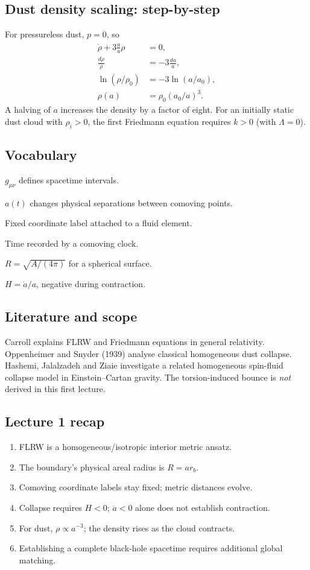 \documentclass[11pt,a4paper]{article}
\begin{document}
\subsection{Dust density scaling: step-by-step}
For pressureless dust, $p=0$, so
\begin{align}
\dot\rho+3\frac{\dot a}{a}\rho&=0,\\
\frac{d\rho}{\rho}&=-3\frac{da}{a},\\
\ln(\rho/\rho_0)&=-3\ln(a/a_0),\\
\boxed{\rho(a)}&=\boxed{\rho_0(a_0/a)^3}.
\end{align}
A halving of $a$ increases the density by a factor of eight. For an initially static dust cloud with $\rho_i>0$, the first Friedmann equation requires $k>0$ (with $\Lambda=0$).
\subsection{Vocabulary}
\begin{description}[style=nextline]
\item[Metric tensor] $g_{\mu\nu}$ defines spacetime intervals.
\item[Scale factor] $a(t)$ changes physical separations between comoving points.
\item[Comoving coordinate] Fixed coordinate label attached to a fluid element.
\item[Proper time] Time recorded by a comoving clock.
\item[Areal radius] $R=\sqrt{A/(4\pi)}$ for a spherical surface.
\item[Hubble parameter] $H=\dot a/a$, negative during contraction.
\end{description}
\subsection{Literature and scope}
Carroll explains FLRW and Friedmann equations in general relativity. Oppenheimer and Snyder (1939) analyse classical homogeneous dust collapse. Hashemi, Jalalzadeh and Ziaie investigate a related homogeneous spin-fluid collapse model in Einstein--Cartan gravity. The torsion-induced bounce is \emph{not} derived in this first lecture.
\subsection{Lecture 1 recap}
\begin{enumerate}[leftmargin=*]
\item FLRW is a homogeneous/isotropic interior metric ansatz.
\item The boundary's physical areal radius is $R=ar_b$.
\item Comoving coordinate labels stay fixed; metric distances evolve.
\item Collapse requires $H<0$; $\ddot a<0$ alone does not establish contraction.
\item For dust, $\rho\propto a^{-3}$; the density rises as the cloud contracts.
\item Establishing a complete black-hole spacetime requires additional global matching.
\end{enumerate}
\end{document}
